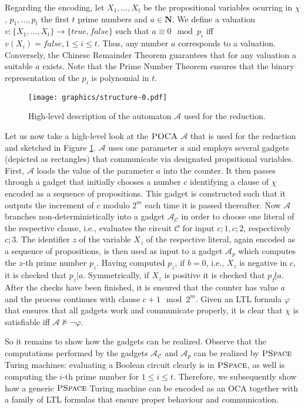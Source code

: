 \documentclass{llncs}
\newcommand{\naturals}{\ensuremath{\mathbf{N}}}
\newcommand{\automaton}{\ensuremath{\mathcal{A}}}
\newcommand{\circuit}{\ensuremath{\mathcal{C}}}
\newcommand{\oca}{\textsc{OCA} }
\newcommand{\poca}{\textsc{POCA} }
\newcommand{\pspace}{\textsc{PSpace} }
\newcommand{\true}{\ensuremath{\mathit{true}}}
\newcommand{\false}{\ensuremath{\mathit{false}}}
\begin{document}
Regarding the encoding, let $X_1,\ldots, X_t$ be the propositional
variables ocurring in $\chi$, $p_1, \ldots, p_t$ the first $t$ prime
numbers and $a\in \naturals$. We define a valuation $v:\{X_1,\ldots,
X_t\}\to \{\true,\false\}$ such that $a\equiv 0 \mod p_i$ iff
$v(X_i)=\false, 1\le i\le t$. Thus, any number $a$ corresponds to a
valuation. Conversely, the Chinese Remainder Theorem guarantees that
for any valuation a suitable $a$ exists. Note that the Prime Number
Theorem ensures that the binary representation of the $p_i$ is
polynomial in $t$.

\begin{figure}
  \begin{center}
    \texttt{[image: graphics/structure-0.pdf]}
  \end{center}
  \caption{High-level description of the automaton $\automaton$ used for
  the reduction.}
  \label{fig:high-level}
\end{figure}

Let us now take a high-level look at the $\poca$ $\automaton$ that is
used for the reduction and sketched in Figure \ref{fig:high-level}.
$\automaton$ uses one parameter $a$ and employs several gadgets
(depicted as rectangles) that communicate via designated propsitional
variables. First, $\automaton$ loads the value of the parameter $a$
into the counter. It then passes through a gadget that initially
chooses a number $c$ identifying a clause of $\chi$ encoded as a
sequence of propositions. This gadget is constructed such that it
outputs the increment of $c$ modulo $2^m$ each time it is passed
thereafter. Now $\automaton$ branches non-deterministically into a
gadget $\automaton_\circuit$ in order to choose one literal of the
respective clause, i.e., evaluates the circuit $\circuit$ for input
$c;1, c;2$, respectively $c;3$. The identifier $z$ of the variable
$X_z$ of the respective literal, again encoded as a sequence of
propositions, is then used as input to a gadget $\automaton_p$ which
computes the $z$-th prime number $p_z$. Having computed $p_z$, if
$b=0$, i.e., $X_z$ is negative in $c$, it is checked that
$p_z|a$. Symmetrically, if $X_z$ is positive it is checked that
$p_z\not|a$. After the checks have been finished, it is ensured that
the counter has value $a$ and the process continues with clause $c+1
\mod 2^m$. Given an LTL formula $\varphi$ that ensures that all
gadgets work and communicate properly, it is clear that $\chi$ is
satisfiable iff $\automaton \not \models \neg \varphi$.

So it remains to show how the gadgets can be realized. Observe that
the computations performed by the gadgets $\automaton_\circuit$ and
$\automaton_p$ can be realized by $\pspace$ Turing machines:
evaluating a Boolean circuit clearly is in $\pspace$, as well is
computing the $i$-th prime number for $1\le i\le t$. Therefore, we
subsequently show how a generic $\pspace$ Turing machine can be
encoded as an \oca together with a family of LTL formulas that ensure
proper behaviour and communication.
\end{document}
